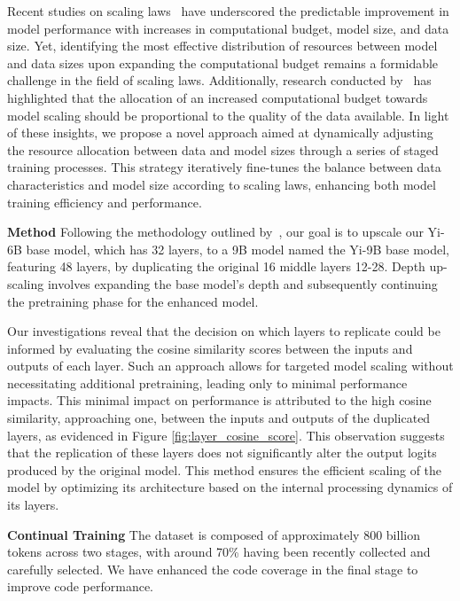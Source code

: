 Recent studies on scaling laws~\citep{henighan2020scaling, hoffmann2022training, kaplan2020scaling} have underscored the predictable improvement in model performance with increases in computational budget, model size, and data size. Yet, identifying the most effective distribution of resources between model and data sizes upon expanding the computational budget remains a formidable challenge in the field of scaling laws. Additionally, research conducted by~\citet{deepseekai2024deepseek} has highlighted that the allocation of an increased computational budget towards model scaling should be proportional to the quality of the data available. In light of these insights, we propose a novel approach aimed at dynamically adjusting the resource allocation between data and model sizes through a series of staged training processes. This strategy iteratively fine-tunes the balance between data characteristics and model size according to scaling laws, enhancing both model training efficiency and performance.

\textbf{Method}\quad
Following the methodology outlined by~\citet{kim2023solar}, our goal is to upscale our Yi-6B base model, which has 32 layers, to a 9B model named the Yi-9B base model, featuring 48 layers, by duplicating the original 16 middle layers 12-28. Depth up-scaling involves expanding the base model's depth and subsequently continuing the pretraining phase for the enhanced model.


Our investigations reveal that the decision on which layers to replicate could be informed by evaluating the cosine similarity scores between the inputs and outputs of each layer. Such an approach allows for targeted model scaling without necessitating additional pretraining, leading only to minimal performance impacts. This minimal impact on performance is attributed to the high cosine similarity, approaching one, between the inputs and outputs of the duplicated layers, as evidenced in Figure \ref{fig:layer_cosine_score}. This observation suggests that the replication of these layers does not significantly alter the output logits produced by the original model. This method ensures the efficient scaling of the model by optimizing its architecture based on the internal processing dynamics of its layers.


\textbf{Continual Training}\quad
The dataset is composed of approximately 800 billion tokens across two stages, with around 70\% having been recently collected and carefully selected. We have enhanced the code coverage in the final stage to improve code performance.

